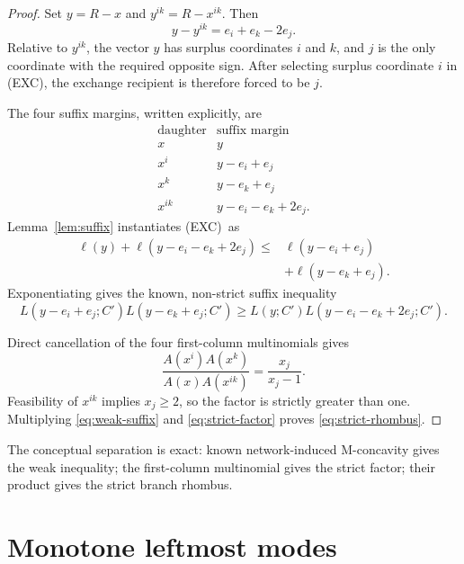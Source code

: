 \documentclass[10pt]{article}
\newcommand{\EXC}{\textup{(EXC)}}
\begin{document}
\begin{proof}
Set \(y=R-x\) and \(y^{ik}=R-x^{ik}\).  Then
\begin{equation}
 y-y^{ik}=e_i+e_k-2e_j.
 \label{eq:forced-vector}
\end{equation}
Relative to \(y^{ik}\), the vector \(y\) has surplus coordinates \(i\)
and \(k\), and \(j\) is the only coordinate with the required opposite
sign.  After selecting surplus coordinate \(i\) in \EXC, the
exchange recipient is therefore forced to be \(j\).

The four suffix margins, written explicitly, are
\[
\begin{array}{c|c}
\text{daughter}&\text{suffix margin}\\ \hline
x&y\\
x^i&y-e_i+e_j\\
x^k&y-e_k+e_j\\
x^{ik}&y-e_i-e_k+2e_j.
\end{array}
\]
Lemma~\ref{lem:suffix} instantiates \EXC\ as
\[
\begin{split}
\ell(y)+\ell(y-e_i-e_k+2e_j)
\le{}&\ell(y-e_i+e_j)\\
&+\ell(y-e_k+e_j).
\end{split}
\]
Exponentiating gives the known, non-strict suffix inequality
\begin{equation}
 L(y-e_i+e_j;C')L(y-e_k+e_j;C')
 \ge L(y;C')L(y-e_i-e_k+2e_j;C').
 \label{eq:weak-suffix}
\end{equation}

Direct cancellation of the four first-column multinomials gives
\begin{equation}
 \frac{A(x^i)A(x^k)}{A(x)A(x^{ik})}
 =\frac{x_j}{x_j-1}.
 \label{eq:strict-factor}
\end{equation}
Feasibility of \(x^{ik}\) implies \(x_j\ge2\), so the factor is
strictly greater than one.  Multiplying \eqref{eq:weak-suffix} and
\eqref{eq:strict-factor} proves \eqref{eq:strict-rhombus}.
\end{proof}

The conceptual separation is exact: known network-induced M-concavity
gives the weak inequality; the first-column multinomial gives the strict
factor; their product gives the strict branch rhombus.

\section{Monotone leftmost modes}
\end{document}
